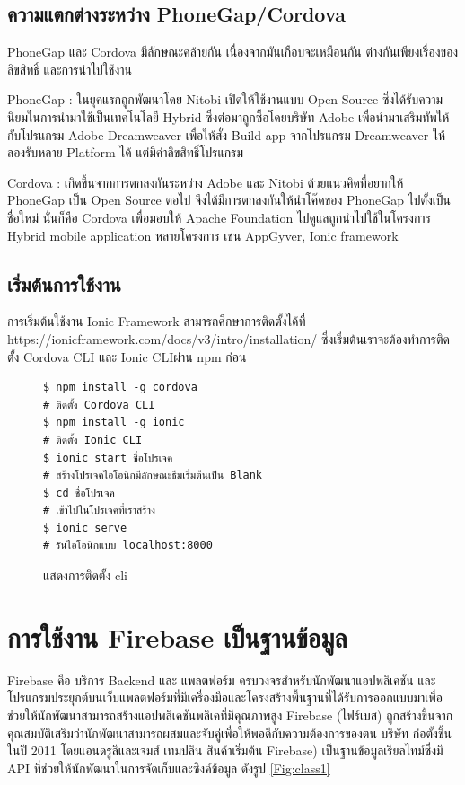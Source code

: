 		\subsection{ความแตกต่างระหว่าง PhoneGap/Cordova}
		PhoneGap และ Cordova มีลักษณะคล้ายกัน เนื่องจากมันเกือบจะเหมือนกัน ต่างกันเพียงเรื่องของลิขสิทธิ์ และการนำไปใช้งาน
		\item PhoneGap : ในยุคแรกถูกพัฒนาโดย Nitobi เปิดให้ใช้งานแบบ Open Source ซึ่งได้รับความนิยมในการนำมาใช้เป็นเทคโนโลยี Hybrid ซึ่งต่อมาถูกซื้อโดยบริษัท Adobe เพื่อนำมาเสริมทัพให้กับโปรแกรม Adobe Dreamweaver เพื่อให้สั่ง Build app จากโปรแกรม Dreamweaver ให้ลองรับหลาย Platform ได้ แต่มีค่าลิขสิทธิ์โปรแกรม
		\item Cordova : เกิดขึ้นจากการตกลงกันระหว่าง Adobe และ Nitobi ด้วยแนวคิดที่อยากให้ PhoneGap เป็น Open Source ต่อไป จึงได้มีการตกลงกันให้นำโค๊ดของ PhoneGap ไปตั้งเป็นชื่อใหม่ นั่นก็คือ Cordova เพื่อมอบให้ Apache Foundation ไปดูแลถูกนำไปใช้ในโครงการ Hybrid mobile application หลายโครงการ เช่น AppGyver, Ionic framework
		 
		\subsection{เริ่มต้นการใช้งาน}
		การเริ่มต้นใช้งาน Ionic Framework สามารถศึกษาการติดตั้งได้ที่ https://ionicframework.com/docs/v3/intro/installation/ ซี่งเริ่มต้นเราจะต้องทำการติดตั้ง Cordova CLI และ Ionic CLIผ่าน npm ก่อน
		\begin{figure}[H]
			{\begin{lstlisting}
$ npm install -g cordova 
# ติดตั้ง Cordova CLI
$ npm install -g ionic 
# ติดตั้ง Ionic CLI
$ ionic start ชื่อโปรเจค
# สร้างโปรเจคไอโอนิกมีลักษณะธีมเริ่มต้นเป็น Blank
$ cd ชื่อโปรเจค
# เข้าไปในโปรเจคที่เราสร้าง
$ ionic serve
# รันไอโอนิกแบบ localhost:8000
				\end{lstlisting}}
			\centering
			\caption{แสดงการติดตั้ง cli}
			\label{Fig:moment}
		\end{figure}
		


	\section{การใช้งาน Firebase เป็นฐานข้อมูล}
	Firebase \cite{bib9} คือ บริการ Backend และ แพลตฟอร์ม ครบวงจรสำหรับนักพัฒนาแอปพลิเคชัน และโปรแกรมประยุกต์บนเว็บแพลตฟอร์มที่มีเครื่องมือและโครงสร้างพื้นฐานที่ได้รับการออกแบบมาเพื่อช่วยให้นักพัฒนาสามารถสร้างแอปพลิเคชันพลิเคที่มีคุณภาพสูง Firebase (ไฟร์เบส) ถูกสร้างขึ้นจากคุณสมบัติเสริมว่านักพัฒนาสามารถผสมและจับคู่เพื่อให้พอดีกับความต้องการของตน บริษัท ก่อตั้งขึ้นในปี 2011 โดยแอนดรูลีและเจมส์ เทมปลิน สินค้าเริ่มต้น Firebase) เป็นฐานข้อมูลเรียลไทม์ซึ่งมี API ที่ช่วยให้นักพัฒนาในการจัดเก็บและซิงค์ข้อมูล ดังรูป \ref{Fig:class1}
	
